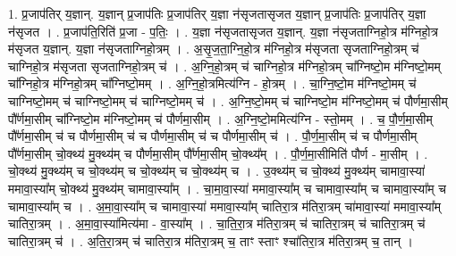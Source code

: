 \documentclass[17pt]{extarticle}
\begin{document}
1. प्र॒जाप॑तिर् य॒ज्ञान्. य॒ज्ञान् प्र॒जाप॑तिः प्र॒जाप॑तिर् य॒ज्ञा न॑सृजतासृजत य॒ज्ञान् प्र॒जाप॑तिः प्र॒जाप॑तिर् य॒ज्ञा न॑सृजत । . प्र॒जाप॑ति॒रिति॑ प्र॒जा - प॒तिः॒ । . य॒ज्ञा न॑सृजतासृजत य॒ज्ञान्. य॒ज्ञा न॑सृजताग्निहो॒त्र म॑ग्निहो॒त्र म॑सृजत य॒ज्ञान्. य॒ज्ञा न॑सृजताग्निहो॒त्रम् । . अ॒सृ॒ज॒ता॒ग्नि॒हो॒त्र म॑ग्निहो॒त्र म॑सृजता सृजताग्निहो॒त्रम् च॑ चाग्निहो॒त्र म॑सृजता सृजताग्निहो॒त्रम् च॑ । . अ॒ग्नि॒हो॒त्रम् च॑ चाग्निहो॒त्र म॑ग्निहो॒त्रम् चा᳚ग्निष्टो॒म म॑ग्निष्टो॒मम् चा᳚ग्निहो॒त्र म॑ग्निहो॒त्रम् चा᳚ग्निष्टो॒मम् । . अ॒ग्नि॒हो॒त्रमित्य॑ग्नि - हो॒त्रम् । . चा॒ग्नि॒ष्टो॒म म॑ग्निष्टो॒मम् च॑ चाग्निष्टो॒मम् च॑ चाग्निष्टो॒मम् च॑ चाग्निष्टो॒मम् च॑ । . अ॒ग्नि॒ष्टो॒मम् च॑ चाग्निष्टो॒म म॑ग्निष्टो॒मम् च॑ पौर्णमा॒सीम् पौ᳚र्णमा॒सीम् चा᳚ग्निष्टो॒म म॑ग्निष्टो॒मम् च॑ पौर्णमा॒सीम् । . अ॒ग्नि॒ष्टो॒ममित्य॑ग्नि - स्तो॒मम् । . च॒ पौ॒र्ण॒मा॒सीम् पौ᳚र्णमा॒सीम् च॑ च पौर्णमा॒सीम् च॑ च पौर्णमा॒सीम् च॑ च पौर्णमा॒सीम् च॑ । . पौ॒र्ण॒मा॒सीम् च॑ च पौर्णमा॒सीम् पौ᳚र्णमा॒सीम् चो॒क्थ्य॑ मु॒क्थ्य॑म् च पौर्णमा॒सीम् पौ᳚र्णमा॒सीम् चो॒क्थ्य᳚म् । . पौ॒र्ण॒मा॒सीमिति॑ पौर्ण - मा॒सीम् । . चो॒क्थ्य॑ मु॒क्थ्य॑म् च चो॒क्थ्य॑म् च चो॒क्थ्य॑म् च चो॒क्थ्य॑म् च । . उ॒क्थ्य॑म् च चो॒क्थ्य॑ मु॒क्थ्य॑म् चामावा॒स्या॑ ममावा॒स्या᳚म् चो॒क्थ्य॑ मु॒क्थ्य॑म् चामावा॒स्या᳚म् । . चा॒मा॒वा॒स्या॑ ममावा॒स्या᳚म् च चामावा॒स्या᳚म् च चामावा॒स्या᳚म् च चामावा॒स्या᳚म् च । . अ॒मा॒वा॒स्या᳚म् च चामावा॒स्या॑ ममावा॒स्या᳚म् चातिरा॒त्र म॑तिरा॒त्रम् चा॑मावा॒स्या॑ ममावा॒स्या᳚म् चातिरा॒त्रम् । . अ॒मा॒वा॒स्या॑मित्य॑मा - वा॒स्या᳚म् । . चा॒ति॒रा॒त्र म॑तिरा॒त्रम् च॑ चातिरा॒त्रम् च॑ चातिरा॒त्रम् च॑ चातिरा॒त्रम् च॑ । . अ॒ति॒रा॒त्रम् च॑ चातिरा॒त्र म॑तिरा॒त्रम् च॒ ताꣳ स्ताꣳ श्चा॑तिरा॒त्र म॑तिरा॒त्रम् च॒ तान् । \newline
\end{document}

